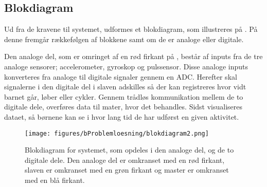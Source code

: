 \subsection{Blokdiagram}
Ud fra de kravene til systemet, udformes et blokdiagram, som illustreres på . På denne fremgår rækkefølgen af blokkene samt om de er analoge eller digitale. 

Den analoge del, som er omringet af en rød firkant på , består af inputs fra de tre analoge sensorer; accelerometer, gyroskop og pulssensor. Disse analoge inputs konverteres fra analoge til digitale signaler gennem en ADC. Herefter skal signalerne i den digitale del i slaven adskilles så der kan registreres hvor vidt barnet går, løber eller cykler. Gennem trådløs kommunikation mellem de to digitale dele, overføres data til mater, hvor det behandles. Sidst visualiseres dataet, så børnene kan se i hvor lang tid de har udførst en given aktivitet.  

 \begin{figure}[H]
 	\centering
 	\texttt{[image: figures/bProblemloesning/blokdiagram2.png]}
 	\caption{Blokdiagram for systemet, som opdeles i den analoge del, og de to digitale dele. Den analoge del er omkranset med en rød firkant, slaven er omkranset med en grøn firkant og master er omkranset med en blå firkant.}
 	\label{fig:blokdiagram}
 \end{figure}
